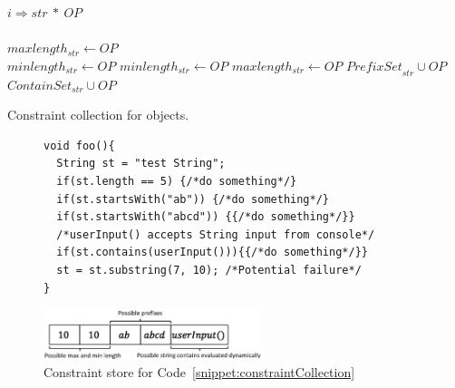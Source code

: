 \begin{algorithm}[t]
\scriptsize
\DontPrintSemicolon
{}
\Begin
{
  {
   $i \Rightarrow str\ *\ OP$ \\
    {\\
   \mytab $maxlength_{str} \longleftarrow OP$\\
   \mytab $minlength_{str} \longleftarrow OP$
   }  {
    $minlength_{str} \longleftarrow OP$
   }  {
    $maxlength_{str} \longleftarrow OP$
   }  {
    $\textit{PrefixSet}_{str} \cup OP$
   }  {
    $\textit{ContainSet}_{str} \cup OP$
   }
  }
}
\caption{Constraint collection for  objects.}
\label{algo:constraintCollection}
\end{algorithm}


\lstset{language=Java, caption=Static and dynamic constraint
collection example, label = snippet:constraintCollection, firstnumber =1}
\begin{figure}[t]
\begin{lstlisting}
void foo(){
  String st = "test String";
  if(st.length == 5) {/*do something*/}
  if(st.startsWith("ab")) {/*do something*/}
  if(st.startsWith("abcd")) {{/*do something*/}}
  /*userInput() accepts String input from console*/
  if(st.contains(userInput())){{/*do something*/}}
  st = st.substring(7, 10); /*Potential failure*/
}
\end{lstlisting}
\end{figure}

\begin{figure}[t]
\centering
\includegraphics[width=2.5in]{images/ConstraintExample.eps}
\caption{Constraint store for Code~\ref{snippet:constraintCollection}}
\label{fig:constraintExample}
\end{figure}

